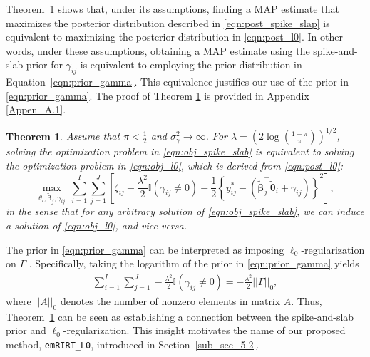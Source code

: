 \documentclass[11pt]{article}
\newtheorem{theorem}{Theorem} \newtheorem{theoremstar}{Theorem}
\begin{document}
Theorem~\ref{theorem1} shows that, under its assumptions, finding a MAP estimate that maximizes the posterior distribution described in \eqref{eqn:post_spike_slap} is equivalent to maximizing the posterior distribution in \eqref{eqn:post_l0}. In other words, under these assumptions, obtaining a MAP estimate using the spike-and-slab prior for $\gamma_{ij}$ is equivalent to employing the prior distribution in Equation~\eqref{eqn:prior_gamma}. This equivalence justifies our use of the prior in \eqref{eqn:prior_gamma}.
The proof of Theorem \ref{theorem1} is provided in Appendix \ref{Appen_A.1}.
\begin{theorem}\label{theorem1}
    Assume that $ \pi < \frac{1}{2} $ and $ \sigma_\gamma^2 \to \infty $. For $ \lambda = \left( 2 \log \left( \frac{1-\pi}{\pi} \right) \right)^{1/2} $, solving the optimization problem in \eqref{eqn:obj_spike_slab} is equivalent to solving the optimization problem in \eqref{eqn:obj_l0}, which is derived from \eqref{eqn:post_l0}:
    \begin{equation}\label{eqn:obj_l0}
        \underset{\theta_i, \boldsymbol{\tilde{\beta}}_j, \gamma_{ij}}{\max} ~\sum_{i=1}^I \sum_{j = 1}^J \left[ \zeta_{ij} - \frac{\lambda^2}{2}\mathbb{I}(\gamma_{ij} \neq 0) - \frac{1}{2}\left\{ y_{ij}^* - (\boldsymbol{\tilde{\beta}}_j^\top \boldsymbol{\tilde{\theta}}_i + \gamma_{ij}) \right\}^2 \right],
    \end{equation}
    in the sense that for any arbitrary solution of \eqref{eqn:obj_spike_slab}, we can induce a solution of \eqref{eqn:obj_l0}, and vice versa.
\end{theorem}

The prior in \eqref{eqn:prior_gamma} can be interpreted as imposing $ \ell_0 $-regularization on $\Gamma$ \citep{Polson_2018}. Specifically, taking the logarithm of the prior in \eqref{eqn:prior_gamma} yields
\begin{align*} \sum_{i=1}^I \sum_{j=1}^J -\frac{\lambda^2}{2} \mathbb{I}(\gamma_{ij} \neq 0) = -\frac{\lambda^2}{2} ||\Gamma||_0, \end{align*} where $||A||_0$ denotes the number of nonzero elements in matrix $A$. Thus, Theorem~\ref{theorem1} can be seen as establishing a connection between the spike-and-slab prior and $ \ell_0 $-regularization. This insight motivates the name of our proposed method, \texttt{emRIRT\_L0}, introduced in Section~\ref{sub_sec_5.2}.

\end{document}
